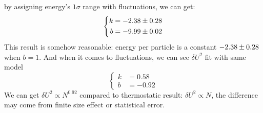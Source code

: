 \documentclass[UTF8,a4paper]{article}
\begin{document}
by assigning energy's $1\sigma$ range with fluctuations, we can get:
\begin{equation}
	\left\{
		\begin{aligned}
			k &= \num[separate-uncertainty = true]{-2.38+-0.28}\\
			b &= \num[separate-uncertainty = true]{-9.99+-0.02}
		\end{aligned}
	\right.
\end{equation}
This result is somehow reasonable: energy per particle is a constant $\num[separate-uncertainty = true]{-2.38+-0.28}$ when $b = 1$. And when it comes to fluctuations, we can see $\delta U^2$ fit with same model 
\begin{equation}
	\left\{
		\begin{aligned}
			k &= 0.58\\
			b &= -0.92
		\end{aligned}
	\right.
\end{equation}
We can get $\delta U^2\propto N^{0.92}$ compared to thermostatic result: $\delta U^2\propto N$, the difference may come from finite size effect or 
statistical error. 
\end{document}
